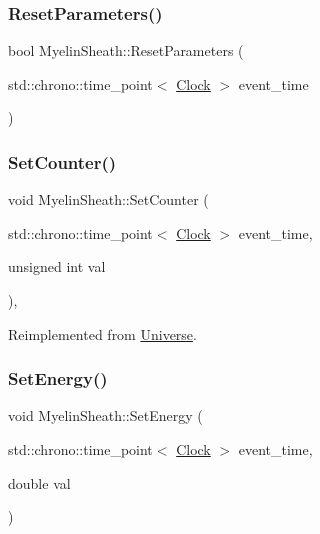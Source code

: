 \mbox{\label{classMyelinSheath_af1174b93be36aa43506a4ba9857d92a4}} 
\subsubsection{\texorpdfstring{Reset\+Parameters()}{ResetParameters()}}
{\footnotesize\ttfamily bool Myelin\+Sheath\+::\+Reset\+Parameters (\begin{DoxyParamCaption}\item[{std\+::chrono\+::time\+\_\+point$<$ \mbox{\hyperlink{universe_8h_a0ef8d951d1ca5ab3cfaf7ab4c7a6fd80}{Clock}} $>$}]{event\+\_\+time }\end{DoxyParamCaption})}

\mbox{\label{classMyelinSheath_afb9cd377a71881558f48cf8bb226af77}} 
\subsubsection{\texorpdfstring{Set\+Counter()}{SetCounter()}}
{\footnotesize\ttfamily void Myelin\+Sheath\+::\+Set\+Counter (\begin{DoxyParamCaption}\item[{std\+::chrono\+::time\+\_\+point$<$ \mbox{\hyperlink{universe_8h_a0ef8d951d1ca5ab3cfaf7ab4c7a6fd80}{Clock}} $>$}]{event\+\_\+time,  }\item[{unsigned int}]{val }\end{DoxyParamCaption})\hspace{0.3cm}{\ttfamily [inline]}, {\ttfamily [virtual]}}



Reimplemented from \mbox{\hyperlink{classUniverse_aa22202ae740eb1355529afcb13285e91}{Universe}}.

\mbox{\label{classMyelinSheath_ad0f6dbae2819f6642a92b8e85ec8f775}} 
\subsubsection{\texorpdfstring{Set\+Energy()}{SetEnergy()}}
{\footnotesize\ttfamily void Myelin\+Sheath\+::\+Set\+Energy (\begin{DoxyParamCaption}\item[{std\+::chrono\+::time\+\_\+point$<$ \mbox{\hyperlink{universe_8h_a0ef8d951d1ca5ab3cfaf7ab4c7a6fd80}{Clock}} $>$}]{event\+\_\+time,  }\item[{double}]{val }\end{DoxyParamCaption})\hspace{0.3cm}{\ttfamily [inline]}}

